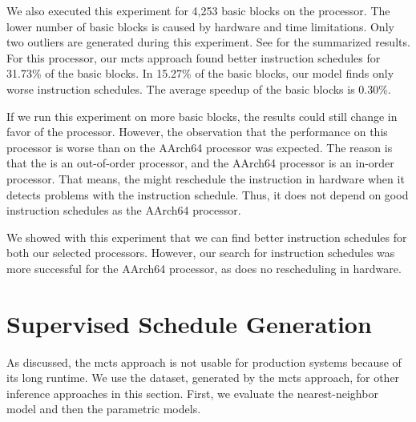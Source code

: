 We also executed this experiment for 4,253 basic blocks on the \aurora processor.
The lower number of basic blocks is caused by hardware and time limitations.
Only two outliers are generated during this experiment.%
See  for the summarized results.
For this processor, our \ac{mcts} approach found better instruction schedules for 31.73\% of the basic blocks.
In 15.27\% of the basic blocks, our model finds only worse instruction schedules.
The average speedup of the basic blocks is 0.30\%.

If we run this experiment on more basic blocks, the results could still change in favor of the \aurora processor.
However, the observation that the performance on this processor is worse than on the AArch64 processor was expected.
The reason is that the \aurora is an out-of-order processor, and the AArch64 processor is an in-order processor.
That means, the \aurora might reschedule the instruction in hardware when it detects problems with the instruction schedule.
Thus, it does not depend on good instruction schedules as the AArch64 processor.

We showed with this experiment that we can find better instruction schedules for both our selected processors.
However, our search for instruction schedules was more successful for the AArch64 processor, as does no rescheduling in hardware.

\section{Supervised Schedule Generation}
\label{sec:eval:supervised}
As discussed, the \ac{mcts} approach is not usable for production systems because of its long runtime.
We use the dataset, generated by the \ac{mcts} approach, for other inference approaches in this section.
First, we evaluate the nearest-neighbor model and then the parametric models.

